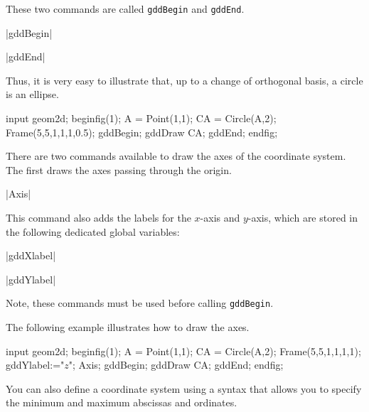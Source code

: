 \documentclass[a4paper,english]{article}
\begin{document}
These two commands are called \lstinline+gddBegin+ and \lstinline+gddEnd+.

\begin{colourband}
\macro|gddBegin|
\end{colourband}

\begin{colourband}
\macro|gddEnd|
\end{colourband}

Thus, it is very easy to illustrate that, up to a change of orthogonal basis, a circle is an ellipse.


\begin{ExempleMP}
input geom2d;
beginfig(1);
A = Point(1,1);
CA = Circle(A,2);
Frame(5,5,1,1,1,0.5);
gddBegin;
gddDraw CA;
gddEnd;
endfig;
\end{ExempleMP}

There are two commands available to draw the axes of the coordinate system. The first draws the axes passing through the origin.
\begin{colourband}
\macro|Axis|
\end{colourband}

This command also adds the labels for the $x$-axis and $y$-axis, which are stored in the following dedicated global variables:
\begin{colourband}
\macro|gddXlabel|
\end{colourband}

\begin{colourband}
\macro|gddYlabel|
\end{colourband}

Note, these commands must be used before calling \lstinline+gddBegin+.

The following example illustrates how to draw the axes.

\begin{ExempleMP}
input geom2d;
beginfig(1);
A = Point(1,1);
CA = Circle(A,2);
Frame(5,5,1,1,1,1);
gddYlabel:="$z$";
Axis;
gddBegin;
gddDraw CA;
gddEnd;
endfig;
\end{ExempleMP}

You can also define a coordinate system using a syntax that allows you to specify the minimum and maximum abscissas and ordinates.
\end{document}
